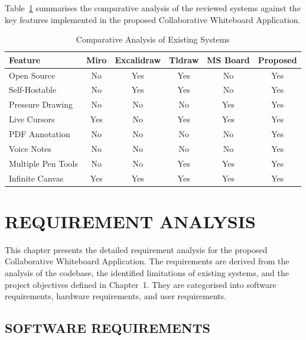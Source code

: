\documentclass[12pt,a4paper]{report}
\begin{document}
Table~\ref{tab:2.1} summarises the comparative analysis of the reviewed systems against the key features implemented in the proposed Collaborative Whiteboard Application.

\begin{table}[htbp]
  \caption{Comparative Analysis of Existing Systems}
  \label{tab:2.1}
  \centering
  \begin{tabular}{@{} l c c c c c @{}}
    \toprule
    \textbf{Feature} & \textbf{Miro} & \textbf{Excalidraw} & \textbf{Tldraw} & \textbf{MS Board} & \textbf{Proposed} \\
    \midrule
    Open Source         & No  & Yes & Yes & No  & Yes \\
    Self-Hostable       & No  & Yes & Yes & No  & Yes \\
    Pressure Drawing    & No  & No  & No  & Yes & Yes \\
    Live Cursors        & Yes & No  & Yes & Yes & Yes \\
    PDF Annotation      & No  & No  & No  & No  & Yes \\
    Voice Notes         & No  & No  & No  & No  & Yes \\
    Multiple Pen Tools  & No  & No  & Yes & Yes & Yes \\
    Infinite Canvas     & Yes & Yes & Yes & Yes & Yes \\
    \bottomrule
  \end{tabular}
\end{table}


\chapter{REQUIREMENT ANALYSIS}
\thispagestyle{empty}

This chapter presents the detailed requirement analysis for the proposed Collaborative Whiteboard Application. The requirements are derived from the analysis of the codebase, the identified limitations of existing systems, and the project objectives defined in Chapter~1. They are categorised into software requirements, hardware requirements, and user requirements.

\section{SOFTWARE REQUIREMENTS}
\end{document}
